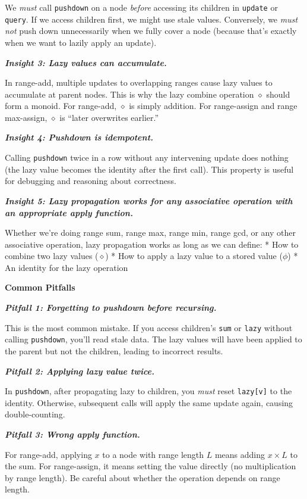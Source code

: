 We {\it must} call {\tt pushdown} on a node {\it before} accessing its children in {\tt update} or {\tt query}. If we access children first, we might use stale values. Conversely, we {\it must not} push down unnecessarily when we fully cover a node (because that's exactly when we want to lazily apply an update).

\bf \it Insight 3: Lazy values can accumulate.\rm

In range-add, multiple updates to overlapping ranges cause lazy values to accumulate at parent nodes. This is why the lazy combine operation $\diamond$ should form a monoid. For range-add, $\diamond$ is simply addition. For range-assign and range max-assign, $\diamond$ is ``later overwrites earlier.''

\bf \it Insight 4: Pushdown is idempotent.\rm

Calling {\tt pushdown} twice in a row without any intervening update does nothing (the lazy value becomes the identity after the first call). This property is useful for debugging and reasoning about correctness.

\bf \it Insight 5: Lazy propagation works for any associative operation with an appropriate apply function.\rm

Whether we're doing range sum, range max, range min, range gcd, or any other associative operation, lazy propagation works as long as we can define:
\begitems
* How to combine two lazy values ($\diamond$)
* How to apply a lazy value to a stored value ($\phi$)
* An identity for the lazy operation
\enditems

{\bf Common Pitfalls}

\bf \it Pitfall 1: Forgetting to pushdown before recursing.\rm

This is the most common mistake. If you access children's {\tt sum} or {\tt lazy} without calling {\tt pushdown}, you'll read stale data. The lazy values will have been applied to the parent but not the children, leading to incorrect results.

\bf \it Pitfall 2: Applying lazy value twice.\rm

In {\tt pushdown}, after propagating lazy to children, you {\it must} reset {\tt lazy[v]} to the identity. Otherwise, subsequent calls will apply the same update again, causing double-counting.

\bf \it Pitfall 3: Wrong apply function.\rm

For range-add, applying $x$ to a node with range length $L$ means adding $x \times L$ to the sum. For range-assign, it means setting the value directly (no multiplication by range length). Be careful about whether the operation depends on range length.

